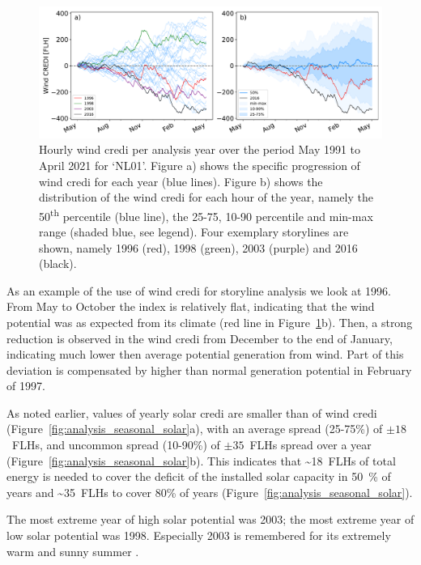 \documentclass[12pt]{iopart}
\newcommand{\ts}[1]{\textsuperscript{#1}}
\newcommand{\sdi}[0]{{\sc solar credi}}
\newcommand{\wdi}[0]{{\sc wind credi}}
\begin{document}
\begin{figure}[b]
        \centering
        \includegraphics[width=\textwidth]{Figures/WindCREDI_annual}    
        \caption{
                Hourly \wdi{} per analysis year over the period May 1991 to April 2021 for `NL01'. 
                Figure a) shows the specific progression of \wdi{} for each year (blue lines). 
                Figure b) shows the distribution of the \wdi{} for each hour of the year, namely the 50\ts{th} percentile (blue line), the 25-75, 10-90 percentile and min-max range (shaded blue, see legend). 
                Four exemplary storylines are shown, namely 1996 (red), 1998 (green), 2003 (purple) and 2016 (black).
        }
        \label{fig:analysis_seasonal_wind}
\end{figure}

As an example of the use of \wdi{} for storyline analysis we look at 1996. From May to October the index is relatively flat, indicating that the wind potential was as expected from its climate (red line in Figure~\ref{fig:analysis_seasonal_wind}b). 
Then, a strong reduction is observed in the \wdi{} from December to the end of January, indicating much lower then average potential generation from wind. Part of this deviation is compensated by higher than normal generation potential in February of 1997.

As noted earlier, values of yearly \sdi{} are smaller than of \wdi{} (Figure~\ref{fig:analysis_seasonal_solar}a), with an average spread (25-75\%) of $\pm18$~FLHs, and uncommon spread (10-90\%) of $\pm35$~FLHs spread over a year (Figure~\ref{fig:analysis_seasonal_solar}b). 
This indicates that \textasciitilde18~FLHs of total energy is needed to cover the deficit of the installed solar capacity in 50~\% of years and \textasciitilde35~FLHs to cover 80\% of years (Figure~\ref{fig:analysis_seasonal_solar}). 

The most extreme year of high solar potential was 2003; the most extreme year of low solar potential was 1998. 
Especially 2003 is remembered for its extremely warm and sunny summer \parencite{GarcaHerrera2010}.
\end{document}
